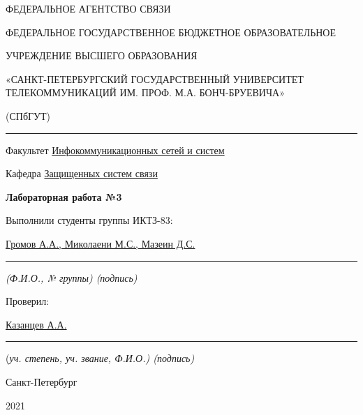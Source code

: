 \documentclass[a4paper,14pt]{extarticle}
\begin{document}
    \begin{center}
        \thispagestyle{empty}
        \begin{singlespace}
        ФЕДЕРАЛЬНОЕ АГЕНТСТВО СВЯЗИ

        ФЕДЕРАЛЬНОЕ ГОСУДАРСТВЕННОЕ БЮДЖЕТНОЕ ОБРАЗОВАТЕЛЬНОЕ

        УЧРЕЖДЕНИЕ ВЫСШЕГО ОБРАЗОВАНИЯ

        «САНКТ-ПЕТЕРБУРГСКИЙ ГОСУДАРСТВЕННЫЙ УНИВЕРСИТЕТ ТЕЛЕКОММУНИКАЦИЙ ИМ. ПРОФ. М.А. БОНЧ-БРУЕВИЧА»

        (СПбГУТ)
        \end{singlespace}
        \vspace{-1ex}
        \rule{\textwidth}{0.4pt}
        \vspace{-5ex}

        Факультет \underline{Инфокоммуникационных сетей и систем}

        Кафедра \underline{Защищенных систем связи}
        \vspace{10ex}

        \textbf{Лабораторная работа №3}\\
        


    \end{center}
    \vspace{4ex}
    \begin{flushright}
    \parbox{10 cm}{
    \begin{flushleft}
        Выполнили студенты группы ИКТЗ-83:

        \underline{Громов А.А., Миколаени М.С., Мазеин Д.С.} \hfill \rule[-0.85ex]{0.1\textwidth}{0.6pt}

        \footnotesize \textit{ (Ф.И.О., № группы) \hfill (подпись)} \normalsize

        Проверил:

        \underline{Казанцев А.А.} \hfill \rule[-0.85ex]{0.1\textwidth}{0.6pt}

        (\footnotesize \textit{уч. степень, уч. звание, Ф.И.О.) \hfill (подпись)} \normalsize

    \end{flushleft}
    }
    \end{flushright}
    \begin{center}
        \vfill
        Санкт-Петербург

        2021

    \end{center}
    \newpage
\end{document}
